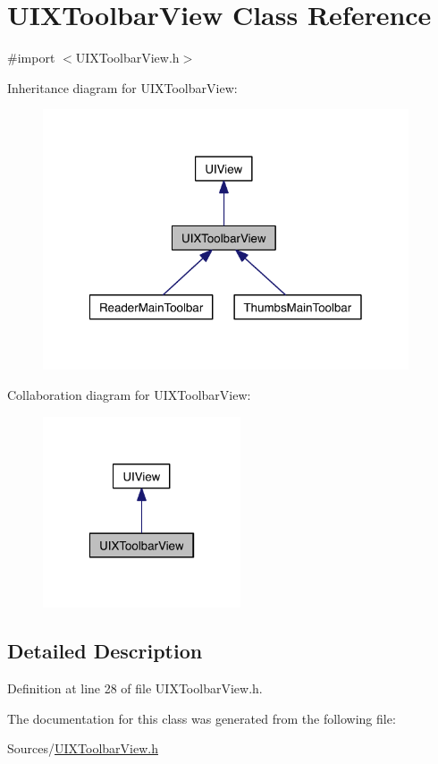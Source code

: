 \hypertarget{interface_u_i_x_toolbar_view}{\section{U\-I\-X\-Toolbar\-View Class Reference}
\label{d3/dea/interface_u_i_x_toolbar_view}
}


{\ttfamily \#import $<$U\-I\-X\-Toolbar\-View.\-h$>$}



Inheritance diagram for U\-I\-X\-Toolbar\-View\-:
\nopagebreak
\begin{figure}[H]
\begin{center}
\leavevmode
\includegraphics[width=307pt]{d7/db8/interface_u_i_x_toolbar_view__inherit__graph}
\end{center}
\end{figure}


Collaboration diagram for U\-I\-X\-Toolbar\-View\-:
\nopagebreak
\begin{figure}[H]
\begin{center}
\leavevmode
\includegraphics[width=166pt]{d5/d94/interface_u_i_x_toolbar_view__coll__graph}
\end{center}
\end{figure}


\subsection{Detailed Description}


Definition at line 28 of file U\-I\-X\-Toolbar\-View.\-h.



The documentation for this class was generated from the following file\-:\begin{DoxyCompactItemize}
\item 
Sources/\hyperlink{_u_i_x_toolbar_view_8h}{U\-I\-X\-Toolbar\-View.\-h}\end{DoxyCompactItemize}
